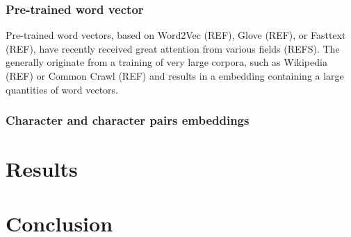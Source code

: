 \documentclass[
twocolumn,
]{ceurart}
\begin{document}
\subsubsection{Pre-trained word vector}

Pre-trained word vectors, based on Word2Vec (REF), Glove (REF), or Fasttext (REF), have recently received great attention from various fields (REFS). The generally originate from a training of very large corpora, such as Wikipedia (REF) or Common Crawl (REF) and results in a embedding containing a large quantities of word vectors.

\subsubsection{Character and character pairs embeddings}


\section{Results}

\section{Conclusion}


\end{document}
